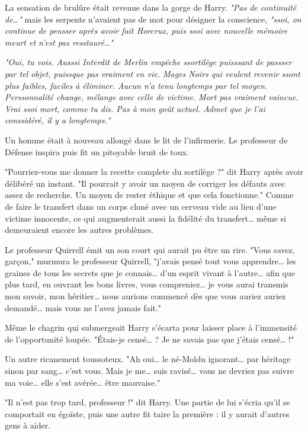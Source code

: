 La sensation de brulûre était revenue dans la gorge de Harry. \emph{"Pas de continuité de…"}  mais les serpents n'avaient pas de mot pour désigner la conscience, \emph{"ssoi, on continue de pensser après avoir fait Horcrux, puis ssoi avec nouvelle mémoire meurt et n'est pas resstauré…"} 

\emph{"Oui, tu vois. Ausssi Interdit de Merlin empêche ssortilège puisssant de passser par tel objet, puissque pas vraiment en vie. Mages Noirs qui veulent revenir ssont plus faibles, faciles à éliminer. Aucun n'a tenu longtemps par tel moyen. Perssonnalité change, mélange avec celle de victime. Mort pas vraiment vaincue. Vrai ssoi mort, comme tu dis. Pas à mon goût actuel. Admet que je l'ai conssidéré, il y a longtemps."} 

Un homme était à nouveau allongé dans le lit de l'infirmerie. Le professeur de Défense inspira puis fit un pitoyable bruit de toux.

"Pourriez-vous me donner la recette complete du sortilège ?" dit Harry après avoir délibéré un instant. "Il pourrait y avoir un moyen de corriger les défauts avec assez de recherche. Un moyen de rester éthique et que cela fonctionne." Comme de faire le transfert dans un corps cloné avec un cerveau vide au lieu d'une victime innocente, ce qui augmenterait aussi la fidélité du transfert… même si demeuraient encore les autres problèmes.

Le professeur Quirrell émit un son court qui aurait pu être un rire. "Vous savez, garçon," murmura le professeur Quirrell, "j'avais pensé tout vous apprendre… les graines de tous les secrets que je connais… d'un esprit vivant à l'autre… afin que plus tard, en ouvrant les bons livres, vous compreniez… je vous aurai transmis mon savoir, mon héritier… nous aurions commencé dès que vous auriez auriez demandé… mais vous ne l'avez jamais fait."

Même le chagrin qui submergeait Harry s'écarta pour laisser place à l'immensité de l'opportunité loupée. "Étais-je censé… ? Je ne savais pas que j'étais censé… !"

Un autre ricanement toussoteux. "Ah oui… le né-Moldu ignorant… par héritage sinon par sang… c'est vous. Mais je me… suis ravisé… vous ne devriez pas suivre ma voie… elle s'est avérée… être mauvaise."

"Il n'est pas trop tard, professeur !" dit Harry. Une partie de lui s'écria qu'il se comportait en égoïste, puis une autre fit taire la première : il y aurait d'autres gens à aider.

